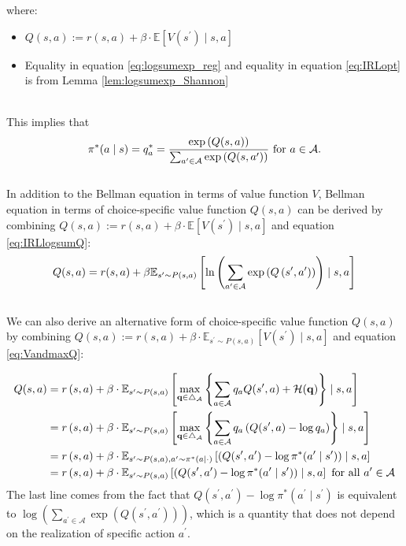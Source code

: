 where:
\begin{itemize}
    \item $Q(s, a):=r\left(s, a\right)+\beta \cdot \mathbb{E}\left[{V}\left(s^\prime\right)\mid s, a\right]$
    \item Equality in equation \ref{eq:logsumexp_reg} and equality in equation \ref{eq:IRLopt} is from Lemma \ref{lem:logsumexp_Shannon}
    
\end{itemize}
\;
\\
This implies that
\begin{align}
    \pi^*(a\mid s) = q^*_a= \frac{\exp \left({Q(s, a)}\right)}{\sum_{a^\prime\in \mathcal{A}} \exp \left({Q(s, a^\prime)}\right)} \text{ for } a\in \mathcal{A}. \notag
\end{align}
\\
In addition to the Bellman equation in terms of value function $V$, 
Bellman equation in terms of choice-specific value function $Q(s,a)$ can be derived by combining $Q(s, a):=r\left(s, a\right)+\beta \cdot \mathbb{E}\left[{V}\left(s^\prime\right)\mid s, a\right]$ and equation \ref{eq:IRLlogsumQ}:
\begin{align}
    Q(s, a)=r(s, a)+\beta \mathbb{E}_{s^\prime \sim P(s, a)}\left[\ln \left(\sum_{a^{\prime} \in \mathcal{A}} \exp \left(Q\left(s^{\prime}, a^{\prime}\right)\right)\right)\mid s, a\right] \notag
\end{align}
\;
\\
We can also derive an alternative form of choice-specific value function $Q(s,a)$ by combining $Q(s, a):=r\left(s, a\right)+\beta \cdot \mathbb{E}_{s^\prime \sim P(s, a)}\left[{V}\left(s^\prime\right)\mid s, a\right]$ and equation \ref{eq:VandmaxQ}:

\begin{align}
    Q(s, a)&=r\left(s, a\right)+\beta \cdot \mathbb{E}_{s^\prime \sim P(s, a)}\left[\max _{\mathbf{q} \in \triangle_\mathcal{A}}\left\{\sum_{a\in \mathcal{A}} q_a Q(s^\prime,a)+\mathcal{H}(\mathbf{q})\right\}\mid s, a\right]\notag
    \\
    &=r\left(s, a\right)+\beta \cdot \mathbb{E}_{s^\prime \sim P(s, a)}\left[\max _{\mathbf{q} \in \triangle_\mathcal{A}}\left\{\sum_{a\in \mathcal{A}} q_a \left(Q(s^\prime,a) - \log q_a\right)\right\}\mid s, a\right]\notag
    \\
    &=r\left(s, a\right)+\beta \cdot \mathbb{E}_{s^\prime \sim P(s, a), a^\prime \sim \pi^*(a\mid \cdot)}\left[ \left(Q(s^\prime,a^\prime) - \log \pi^*(a^\prime\mid s^\prime)\right)\mid s, a\right] \label{eqn:IRLQBellman_new}
    \\
    &=r\left(s, a\right)+\beta \cdot \mathbb{E}_{s^\prime \sim P(s, a)}\left[ \left(Q(s^\prime,a^\prime) - \log \pi^*(a^\prime\mid s^\prime)\right)\mid s, a\right]\text{ for all } a^\prime\in \mathcal{A} \notag
\end{align}
The last line comes from the fact that $Q(s^\prime,a^\prime) - \log \pi^*(a^\prime\mid s^\prime)$ is equivalent to $\log \left(\sum_{a^{\prime} \in \mathcal{A}} \exp \left(Q\left(s^{\prime}, a^{\prime}\right)\right)\right)$, which is a quantity that does not depend on the realization of specific action $a^\prime$.


